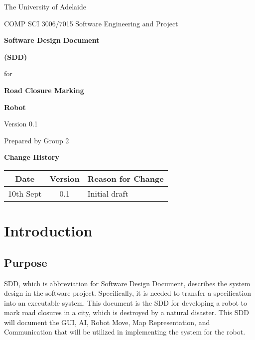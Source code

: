 \documentclass[11pt, a4paper,titlepage]{article}
\begin{document}
 \begin{titlepage}
 \centerline{\small The University of Adelaide}
 \centerline{\small COMP SCI 3006/7015 Software Engineering and Project}
 \vspace{5cm}
 \centerline{\bf \huge Software Design Document}
 \centerline{\bf \huge (SDD)}
 \vspace{0.5cm}
 \centerline{\LARGE for}
 \vspace{0.5cm}
 \centerline{\bf \huge Road Closure Marking}
 \centerline{\bf \huge Robot}
 \vspace{1cm}
 \centerline{Version 0.1}
 \vspace{1cm}
 \centerline{Prepared by Group 2}
  \end{titlepage}
 \tableofcontents
 \newpage
 {\bf \large Change History}\newline

 \begin{tabular}{| c | c | l |}
  \hline
  Date & Version & Reason for Change \\
  \hline
  10th Sept & 0.1 & Initial draft \\
  \hline
 \end{tabular}

 \newpage
  \section{Introduction}
    \subsection{Purpose}
    SDD, which is abbreviation for Software Design Document, describes the system design in the software project. Specifically, it is needed to transfer a specification into an executable system. This document is the SDD for developing a robot to mark road closures in a city, which is destroyed by a natural disaster.
This SDD will document the GUI, AI, Robot Move, Map Representation, and Communication that will be utilized in implementing the system for the robot.\\
\end{document}
